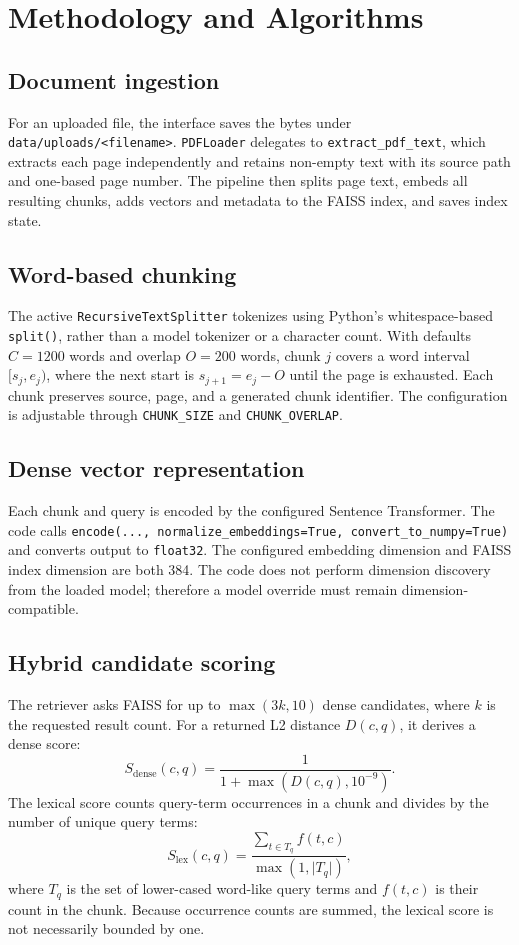 \chapter{Methodology and Algorithms}
\label{ch:methodology}

\section{Document ingestion}
For an uploaded file, the interface saves the bytes under \texttt{data/uploads/<filename>}. \texttt{PDFLoader} delegates to \texttt{extract\_pdf\_text}, which extracts each page independently and retains non-empty text with its source path and one-based page number. The pipeline then splits page text, embeds all resulting chunks, adds vectors and metadata to the FAISS index, and saves index state.

\section{Word-based chunking}
The active \texttt{RecursiveTextSplitter} tokenizes using Python's whitespace-based \texttt{split()}, rather than a model tokenizer or a character count. With defaults \(C=1200\) words and overlap \(O=200\) words, chunk \(j\) covers a word interval \([s_j,e_j)\), where the next start is \(s_{j+1}=e_j-O\) until the page is exhausted. Each chunk preserves source, page, and a generated chunk identifier. The configuration is adjustable through \texttt{CHUNK\_SIZE} and \texttt{CHUNK\_OVERLAP}.

\section{Dense vector representation}
Each chunk and query is encoded by the configured Sentence Transformer. The code calls \texttt{encode(..., normalize\_embeddings=True, convert\_to\_numpy=True)} and converts output to \texttt{float32}. The configured embedding dimension and FAISS index dimension are both 384. The code does not perform dimension discovery from the loaded model; therefore a model override must remain dimension-compatible.

\section{Hybrid candidate scoring}
The retriever asks FAISS for up to \(\max(3k,10)\) dense candidates, where \(k\) is the requested result count. For a returned L2 distance \(D(c,q)\), it derives a dense score:
\begin{equation}
S_{\mathrm{dense}}(c,q)=\frac{1}{1+\max(D(c,q),10^{-9})}.
\label{eq:dense-score}
\end{equation}
The lexical score counts query-term occurrences in a chunk and divides by the number of unique query terms:
\begin{equation}
S_{\mathrm{lex}}(c,q)=
\frac{\sum_{t\in T_q} f(t,c)}{\max(1,\lvert T_q\rvert)},
\label{eq:lexical-score}
\end{equation}
where \(T_q\) is the set of lower-cased word-like query terms and \(f(t,c)\) is their count in the chunk. Because occurrence counts are summed, the lexical score is not necessarily bounded by one.

